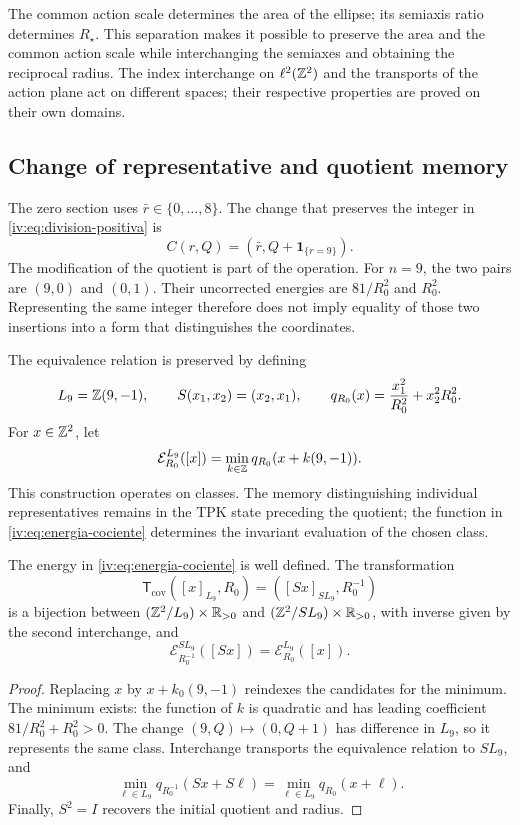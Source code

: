 The common action scale determines the area of the ellipse; its semiaxis
ratio determines \(R_\star\). This separation makes it possible to preserve
the area and the common action scale while interchanging the semiaxes and obtaining
the reciprocal radius. The index interchange on \(\ell^2(\mathbb Z^2)\)
and the transports of the action plane act on different spaces;
their respective properties are proved on their own domains.

\subsection{Change of representative and quotient memory}

The zero section uses \(\bar r\in\{0,\ldots,8\}\). The change
that preserves the integer in \eqref{iv:eq:division-positiva} is
\begin{equation}
 C(r,Q)=(\bar r,Q+\mathbf1_{\{r=9\}}).
 \label{iv:eq:cambio-seccion}
\end{equation}
The modification of the quotient is part of the operation.
For \(n=9\), the two pairs are \((9,0)\) and \((0,1)\).
Their uncorrected energies are \(81/R_0^2\) and \(R_0^2\).
Representing the same integer therefore does not imply equality of
those two insertions into a form that distinguishes the coordinates.

The equivalence relation is preserved by defining
\[
 L_9=\mathbb Z(9,-1),\qquad S(x_1,x_2)=(x_2,x_1),
 \qquad q_{R_0}(x)=\frac{x_1^2}{R_0^2}+x_2^2R_0^2.
\]
For \(x\in\mathbb Z^2\), let
\begin{equation}
 \mathcal E_{R_0}^{L_9}([x])
 =\min_{k\in\mathbb Z}q_{R_0}(x+k(9,-1)).
 \label{iv:eq:energia-cociente}
\end{equation}
This construction operates on classes. The memory distinguishing
individual representatives remains in the TPK state preceding
the quotient; the function in \eqref{iv:eq:energia-cociente}
determines the invariant evaluation of the chosen class.

\begin{theorem}
\label{iv:thm:dualidad-cociente}
The energy in \eqref{iv:eq:energia-cociente} is well defined.
The transformation
\[
 \mathsf T_{\mathrm{cov}}([x]_{L_9},R_0)
 =([Sx]_{SL_9},R_0^{-1})
\]
is a bijection between
\((\mathbb Z^2/L_9)\times\mathbb R_{>0}\) and
\((\mathbb Z^2/SL_9)\times\mathbb R_{>0}\), with inverse given by the
second interchange, and
\[
 \mathcal E_{R_0^{-1}}^{SL_9}([Sx])
 =\mathcal E_{R_0}^{L_9}([x]).
\]
\end{theorem}
\begin{proof}
Replacing \(x\) by \(x+k_0(9,-1)\) reindexes the candidates
for the minimum. The minimum exists: the function of \(k\) is quadratic and
has leading coefficient \(81/R_0^2+R_0^2>0\). The change
\((9,Q)\mapsto(0,Q+1)\) has difference in \(L_9\), so
it represents the same class. Interchange transports
the equivalence relation to \(SL_9\), and
\[
 \min_{\ell\in L_9}q_{R_0^{-1}}(Sx+S\ell)
 =\min_{\ell\in L_9}q_{R_0}(x+\ell).
\]
Finally, \(S^2=I\) recovers the initial quotient and radius.
\end{proof}

